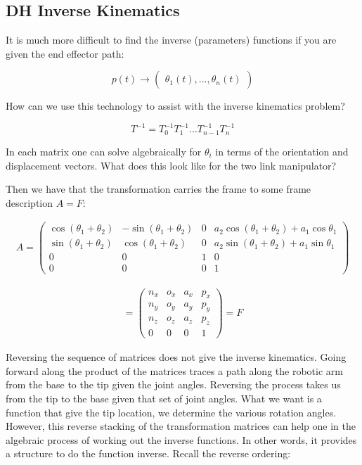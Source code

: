 \hypertarget{dh-inverse-kinematics}{%
\subsection{DH Inverse Kinematics}\label{dh-inverse-kinematics}}

It is much more difficult to find the inverse (parameters) functions if
you are given the end effector path:

\[p(t) \to \begin{pmatrix} \theta_1(t), ... , \theta_n(t)
           \end{pmatrix}\]

How can we use this technology to assist with the inverse kinematics
problem?

\[T^{-1}
  = T_0^{-1} T_{1}^{-1} \dots T_{n-1}^{-1} T_n^{-1}\]

In each matrix one can solve algebraically for \(\theta_i\) in terms of
the orientation and displacement vectors. What does this look like for
the two link manipulator?

Then we have that the transformation carries the frame to some frame
description \(A = F\):

\[\begin{aligned}
A = \begin{pmatrix}\cos (\theta_1+\theta_2) & -\sin (\theta_1+\theta_2) & 0 & a_2 \cos (\theta_1+\theta_2) + a_1 \cos \theta_1 \\
\sin (\theta_1 +\theta_2) & \cos (\theta_1 +\theta_2) & 0 & a_2 \sin (\theta_1 +\theta_2) + a_1\sin \theta_1\\
         0 &0 & 1 & 0 \\
         0& 0& 0& 1
  \end{pmatrix}
\end{aligned}\]

\[\begin{aligned}
=
  \begin{pmatrix}
         n_x & o_x & a_x & p_x \\
         n_y & o_y & a_y & p_y\\
         n_z & o_z & a_z & p_z \\
         0  &  0  &  0 & 1 \end{pmatrix} = F
\end{aligned}\]

Reversing the sequence of matrices does not give the inverse kinematics.
Going forward along the product of the matrices traces a path along the
robotic arm from the base to the tip given the joint angles. Reversing
the process takes us from the tip to the base given that set of joint
angles. What we want is a function that give the tip location, we
determine the various rotation angles. However, this reverse stacking of
the transformation matrices can help one in the algebraic process of
working out the inverse functions. In other words, it provides a
structure to do the function inverse. Recall the reverse ordering:

